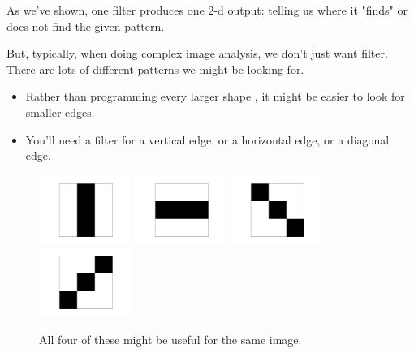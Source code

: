         As we've shown, one filter produces one 2-d output: telling us where it "finds" or does not find the given pattern.

        But, typically, when doing complex image analysis, we don't just want  filter. There are lots of different patterns we might be looking for.

        \begin{itemize}
            \item \miniex Rather than programming every larger shape , it might be easier to look for smaller edges.
            \item You'll need a  filter for a vertical edge, or a horizontal edge, or a diagonal edge.
            
        \end{itemize}

        \begin{figure}[H]
            \centering
            \includegraphics[width=30mm,scale=0.5]{images/convolutional_neural_networks_images/vertical_edge.png}
            \includegraphics[width=30mm,scale=0.5]{images/convolutional_neural_networks_images/horizontal_edge.png}
            \includegraphics[width=30mm,scale=0.5]{images/convolutional_neural_networks_images/diag_1.png}
            \includegraphics[width=30mm,scale=0.5]{images/convolutional_neural_networks_images/diag_2.png}
            
            \caption*{All four of these might be useful for the same image.}
        \end{figure}

